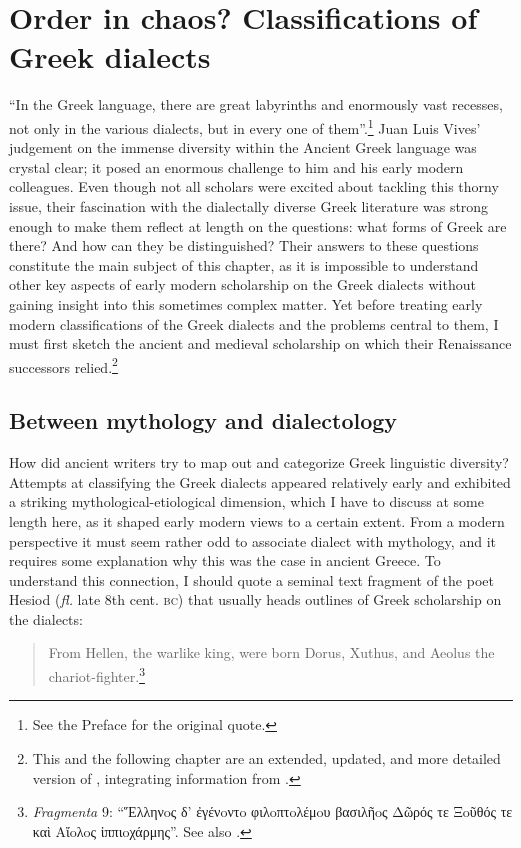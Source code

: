 \chapter{Order in chaos? Classifications of Greek dialects}\label{chap:2}

“In the Greek language, there are great labyrinths and enormously vast recesses, not only in the various dialects, but in every one of them”.\footnote{See the Preface for the original quote.} Juan Luis Vives’ judgement on the immense diversity within the Ancient Greek language was crystal clear; it posed an enormous challenge to him and his early modern colleagues. Even though not all scholars were excited about tackling this thorny issue, their fascination with the dialectally diverse Greek literature was strong enough to make them reflect at length on the questions: what forms of Greek are there? And how can they be distinguished? Their answers to these questions constitute the main subject of this chapter, as it is impossible to understand other key aspects of early modern scholarship on the Greek dialects without gaining insight into this sometimes complex matter. Yet before treating early modern classifications of the Greek dialects and the problems central to them, I must first sketch the ancient and medieval scholarship on which their Renaissance successors relied.\footnote{This and the following chapter are an extended, updated, and more detailed version of \citet{VanRooy2016a}, integrating information from \citet{VanRooy2018b}.}

\section{Between mythology and dialectology}\label{sec:2.1} 

How did ancient writers try to map out and categorize Greek linguistic diversity? Attempts at classifying the Greek dialects appeared relatively early and exhibited a striking mythological-etiological dimension, which I have to discuss at some length here, as it shaped early modern views to a certain extent. From a modern perspective it must seem rather odd to associate dialect with mythology, and it requires some explanation why this was the case in ancient Greece. To understand this connection, I should quote a seminal text fragment of the poet Hesiod (\textit{fl.} late 8th cent. \textsc{bc}) that usually heads outlines of Greek scholarship on the dialects:

\begin{quote}
From Hellen, the warlike king, were born  Dorus, Xuthus, and Aeolus the chariot-fighter.\footnote{\textit{Fragmenta} 9: “Ἕλληνoς δ’ ἐγένoντo φιλoπτoλέμoυ βασιλῆoς {\textbar} Δῶρός τε Ξoῦθός τε καὶ Aἴoλoς ἱππιoχάρμης”. See also \citet[64]{Hainsworth1967}.}
\end{quote}


